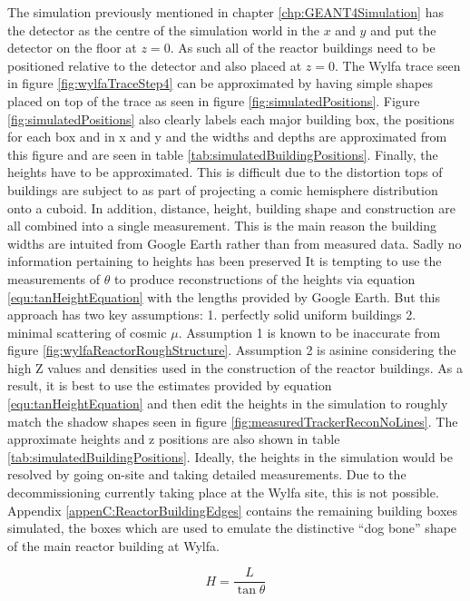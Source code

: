 The simulation previously mentioned in chapter \ref{chp:GEANT4Simulation} has the detector as the centre of the simulation world in the $x$ and $y$ and put the detector on the floor at  $z = 0 $. As such all of the reactor buildings need to be positioned relative to the detector and also placed at $z = 0$. The Wylfa trace seen in figure \ref{fig:wylfaTraceStep4} can be approximated by having simple shapes placed on top of the trace as seen in figure \ref{fig:simulatedPositions}. Figure \ref{fig:simulatedPositions} also clearly labels each major building box, the positions for each box and in x and y and the widths and depths are approximated from this figure and are seen in table \ref{tab:simulatedBuildingPositions}. Finally, the heights have to be approximated. This is difficult due to the distortion tops of buildings are subject to as part of projecting a comic hemisphere distribution onto a cuboid. In addition, distance, height, building shape and construction are all combined into a single measurement. This is the main reason the building widths are intuited from Google Earth rather than from measured data. Sadly no information pertaining to heights has been preserved It is tempting to use the measurements of $\theta$ to produce reconstructions of the heights via equation \ref{equ:tanHeightEquation} with the lengths provided by Google Earth. But this approach has two key assumptions: 1. perfectly solid uniform buildings 2. minimal scattering of cosmic $\mu$. Assumption 1 is known to be inaccurate from figure \ref{fig:wylfaReactorRoughStructure}. Assumption 2 is asinine considering the high Z values and densities used in the construction of the reactor buildings. As a result, it is best to use the estimates provided by equation \ref{equ:tanHeightEquation} and then edit the heights in the simulation to roughly match the shadow shapes seen in figure \ref{fig:measuredTrackerReconNoLines}. The approximate heights and z positions are also shown in table \ref{tab:simulatedBuildingPositions}. Ideally, the heights in the simulation would be resolved by going on-site and taking detailed measurements. Due to the decommissioning currently taking place at the Wylfa site, this is not possible. Appendix \ref{appenC:ReactorBuildingEdges} contains the remaining building boxes simulated, the boxes which are used to emulate the distinctive ``dog bone'' shape of the main reactor building at Wylfa.

\begin{equation}
H = \frac{L}{\tan{\theta}}
\label{equ:tanHeightEquation}
\end{equation}

